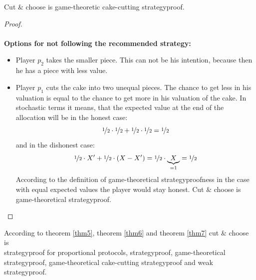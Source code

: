 \begin{lem}
\label{thm7}
Cut $\&$ choose is game-theoretic cake-cutting strategyproof.
\end{lem}
\begin{proof}
\textcolor{white}{x}\\\\
\textbf{Options for not following the recommended strategy:}
\begin{itemize}
\item Player $p_2$ takes the smaller piece. This can not be his intention, because then he has a piece with less value.
\item Player $p_1$ cuts the cake into two unequal pieces. The chance to get less in his valuation is equal to the chance to get more in his valuation of the cake. In stochastic terms it means, that the expected value at the end of the allocation will be in the honest case: $$ \nicefrac{1}{2} \cdot \nicefrac{1}{2}+\nicefrac{1}{2} \cdot \nicefrac{1}{2}=\nicefrac{1}{2} $$ and in the dishonest case: $$ \nicefrac{1}{2} \cdot X' +\nicefrac{1}{2} \cdot (X-X') =\nicefrac{1}{2} \cdot \underbrace{X}_{=1}=\nicefrac{1}{2}$$ According to the definition of game-theoretical strategyproofness in the case with equal expected values the player would stay honest. Cut $\&$ choose is game-theoretical strategyproof.
\end{itemize}
\end{proof}
\begin{bezeichnungen}
According to theorem \ref{thm5}, theorem \ref{thm6} and theorem \ref{thm7} cut $\&$ choose is\\strategyproof for proportional protocols, strategyproof, game-theoretical strategyproof, game-theoretical cake-cutting strategyproof and weak strategyproof.
\end{bezeichnungen}
